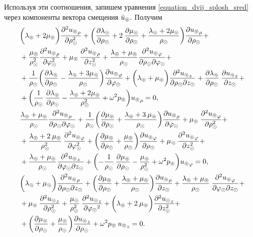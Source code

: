 Используя эти соотношения, запишем уравнения \eqref{equation_dvij_splosh_sred} через компоненты вектора смещения $\bar{u}_\circledcirc.$ Получим
\begin{equation}\label{equation_otn_u}
\begin{aligned}
&\biggl(\lambda_\circledcirc+2\mu_\circledcirc\biggr)\frac{\partial^2{u_\circledcirc}_{\rho}}{\partial \rho^2_\odot}
+\biggl(\frac{\partial\lambda_\circledcirc}{\partial \rho_\odot}+2\:\frac{\partial\mu_\circledcirc}{\partial \rho_\odot}+\frac{\lambda_\circledcirc+2\mu_\circledcirc}{\rho_\odot}\biggr)\frac{\partial {u_\circledcirc}_{\rho}}{\partial \rho_\odot}+\\
&+\frac{\mu_\circledcirc}{\rho^2_\odot}\frac{\partial^2 {u_\circledcirc}_{\rho}}{\partial \varphi^2_\odot}
+\mu_\circledcirc\:\frac{\partial^2 {u_\circledcirc}_{\rho}}{\partial z^2_\odot}
+\frac{\lambda_\circledcirc+\mu_\circledcirc}{\rho_\odot}\frac{\partial^2 {u_\circledcirc}_{\varphi}}{\partial \rho_\odot\partial\varphi_\odot}+\\
&+\frac{1}{\rho_\odot}\biggl(\frac{\partial\lambda_\circledcirc}{\partial \rho_\odot}-\frac{\lambda_\circledcirc+3\mu_\circledcirc}{\rho_\odot}\biggr)\frac{\partial {u_\circledcirc}_{\varphi}}{\partial\varphi_\odot}
+\biggl(\lambda_\circledcirc+\mu_\circledcirc\biggr)\frac{\partial^2 {u_\circledcirc}_{z}}{\partial \rho_\odot\partial z_\odot}
+\frac{\partial\lambda_\circledcirc}{\partial \rho_\odot}\:\frac{\partial {u_\circledcirc}_{z}}{\partial z_\odot}+\\
&+\biggl(\frac{1}{\rho_\odot}\:\frac{\partial\lambda_\circledcirc}{\partial \rho_\odot}-\frac{\lambda_\circledcirc+2\mu_\circledcirc}{\rho^2_\odot}+\omega^2 p_\circledcirc\biggr){u_\circledcirc}_{\rho}=0,\\
&\frac{\lambda_\circledcirc+\mu_\circledcirc}{\rho_\odot}\frac{\partial^2{u_\circledcirc}_{\rho}}{\partial \rho_\odot\partial\varphi_\odot}+\frac{1}{\rho_\odot}\biggl(\frac{\partial\mu_\circledcirc}{\partial \rho_\odot}+\frac{\lambda_\circledcirc+3\:\mu_\circledcirc}{\rho_\odot}\biggr)\frac{\partial {u_\circledcirc}_{\rho}}{\partial\varphi_\odot}+\mu_\circledcirc\:\frac{\partial^2 {u_\circledcirc}_{\varphi}}{\partial \rho^2_\odot}+\\
&+\frac{\lambda_\circledcirc+2\:\mu_\circledcirc}{\rho^2_\odot}\:\frac{\partial^2 {u_\circledcirc}_{\varphi}}{\partial \varphi^2_\odot}+\biggl(\frac{\partial\mu_\circledcirc}{\partial \rho_\odot}+\frac{\mu_\circledcirc}{\rho_\odot}\biggr)\frac{\partial {u_\circledcirc}_{\varphi}}{\partial \rho_\odot}+\mu_\circledcirc\:\frac{\partial^2 {u_\circledcirc}_{\varphi}}{\partial z^2_\odot}+\\
&+\frac{\lambda_\circledcirc+\mu_\circledcirc}{\rho_\odot}\frac{\partial^2 {u_\circledcirc}_{z}}{\partial \varphi_\odot\partial z_\odot}+\biggl(-\frac{1}{\rho_\odot}\:\frac{\partial\mu_\circledcirc}{\partial \rho_\odot}-\frac{\mu_\circledcirc}{\rho^2_\odot}+\omega^2 p_\circledcirc\biggr){u_\circledcirc}_{\varphi}=0,\\
&\biggl(\lambda_\circledcirc+\mu_\circledcirc\biggr)\frac{\partial^2{u_\circledcirc}_{\rho}}{\partial \rho_\odot\partial z_\odot}+\biggl(\frac{\partial\mu_\circledcirc}{\partial \rho_\odot}+\frac{\lambda_\circledcirc+\mu_\circledcirc}{\rho_\odot}\biggr)\frac{\partial {u_\circledcirc}_{\rho}}{\partial z_\odot}+\frac{\lambda_\circledcirc+\mu_\circledcirc}{\rho_\odot}\:\frac{\partial^2 {u_\circledcirc}_{\varphi}}{\partial \varphi_\odot\partial z_\odot}+\\
&+\mu_\circledcirc\:\frac{\partial^2 {u_\circledcirc}_{z}}{\partial \rho^2_\odot}+\frac{\mu_\circledcirc}{\rho^2_\odot}\:\frac{\partial^2 {u_\circledcirc}_{z}}{\partial {\varphi_\odot}^2}+\biggl(\lambda_\circledcirc+2\:\mu_\circledcirc\biggr)\frac{\partial^2 {u_\circledcirc}_{z}}{\partial z^2_\odot}+\\
&+\biggl(\frac{\partial\mu_\circledcirc}{\partial \rho_\odot}+\frac{\mu_\circledcirc}{\rho_\odot}\biggr)\frac{\partial {u_\circledcirc}_{z}}{\partial \rho_\odot}+\omega^2 p_\circledcirc\:{u_\circledcirc}_{z}=0.
\end{aligned}
\end{equation}

